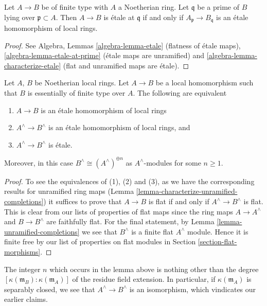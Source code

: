 \begin{lemma}
\label{lemma-characterize-etale-Noetherian}
Let $A \to B$ be of finite type with $A$ a Noetherian ring.
Let $\mathfrak q$ be a prime of $B$ lying over $\mathfrak p \subset A$.
Then $A \to B$ is \'etale at $\mathfrak q$ if and only if
$A_{\mathfrak p} \to B_{\mathfrak q}$ is an \'etale homomorphism
of local rings.
\end{lemma}

\begin{proof}
See Algebra, Lemmas \ref{algebra-lemma-etale} (flatness of \'etale maps),
\ref{algebra-lemma-etale-at-prime} (\'etale maps are unramified)
and \ref{algebra-lemma-characterize-etale} (flat and unramified maps
are \'etale).
\end{proof}

\begin{lemma}
\label{lemma-characterize-etale-completions}
Let $A$, $B$ be Noetherian local rings.
Let $A \to B$ be a local homomorphism such that $B$ is essentially of
finite type over $A$.
The following are equivalent
\begin{enumerate}
\item $A \to B$ is an \'etale homomorphism of local rings
\item $A^\wedge \to B^\wedge$ is an \'etale homomorphism of local rings, and
\item $A^\wedge \to B^\wedge$ is \'etale.
\end{enumerate}
Moreover, in this case $B^\wedge \cong (A^\wedge)^{\oplus n}$ as
$A^\wedge$-modules for some $n \geq 1$.
\end{lemma}

\begin{proof}
To see the equivalences of (1), (2) and (3), as we have the corresponding
results for unramified ring maps
(Lemma \ref{lemma-characterize-unramified-completions})
it suffices to prove that
$A \to B$ is flat if and only if $A^\wedge \to B^\wedge$ is flat.
This is clear from our lists of properties of flat maps since
the ring maps $A \to A^\wedge$ and $B \to B^\wedge$ are faithfully flat.
For the final statement, by Lemma \ref{lemma-unramified-completions}
we see that $B^\wedge$ is a finite flat $A^\wedge$ module.
Hence it is finite free by our list
of properties on flat modules in Section \ref{section-flat-morphisms}.
\end{proof}

\noindent
The integer $n$ which occurs in the lemma above
is nothing other than the degree
$[\kappa(\mathfrak m_B) : \kappa(\mathfrak m_A)]$ of the residue field
extension. In particular, if $\kappa(\mathfrak m_A)$
is separably closed, we see that $A^\wedge \to B^\wedge$
is an isomorphism, which vindicates our earlier claims.

